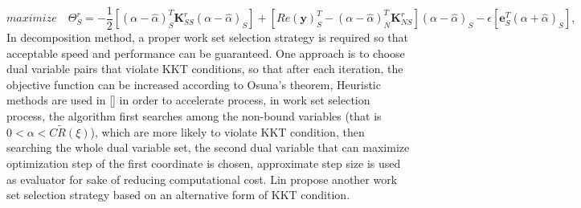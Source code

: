 \documentclass[12pt, draftclsnofoot, onecolumn]{IEEEtran}
\begin{document}
\begin{equation}
maximize\quad \Theta_{S}^{r}=-\frac{1}{2}[(\alpha-\hat{\alpha})_{S}^{T}\mathbf{K}_{SS}^{r}(\alpha-\hat{\alpha})_{S}]+[Re(\mathbf{y})_{S}^{T}-(\alpha-\hat{\alpha})_{N}^{T}\mathbf{K}_{NS}^{r}
](\alpha-\hat{\alpha})_{S}-\epsilon[\mathbf{e}_{S}^{T}(\alpha+\hat{\alpha})_{S}],
\label{subset optimization}
\end{equation}
In decomposition method, a proper work set selection strategy is required so that acceptable speed and performance can be guaranteed. One approach is to choose dual variable pairs that violate KKT conditions, so that after each iteration, the objective function can be increased according to Osuna's theorem\cite{inproved training algorithms for support vector machines}, Heuristic methods are used in [\cite{SMO}] in order to accelerate process, in work set selection process, the algorithm first searches among the non-bound variables (that is $0<\alpha<C\tilde{R}(\xi)$), which are more likely to violate KKT condition, then searching the whole dual variable set, the second dual variable that can maximize optimization step of the first coordinate is chosen, approximate step size is used as evaluator for sake of reducing computational cost. Lin propose another work set selection strategy based on an alternative form of KKT condition.
\end{document}
